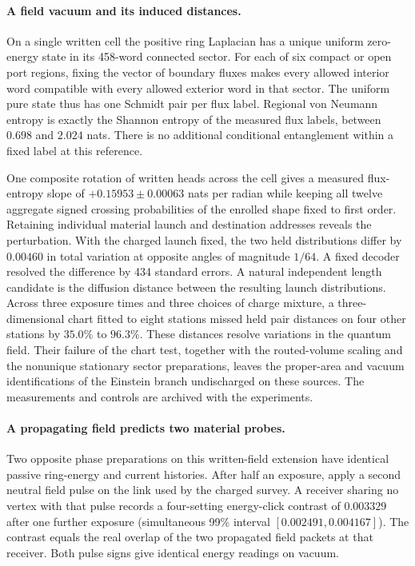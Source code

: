 \documentclass[11pt]{article}
\begin{document}
\paragraph{A field vacuum and its induced distances.}
On a single written cell the positive ring Laplacian has a unique
uniform zero-energy state in its 458-word connected sector. For each of
six compact or open port regions, fixing the vector of boundary fluxes
makes every allowed interior word compatible with every allowed exterior
word in that sector. The uniform pure state thus has one Schmidt pair
per flux label. Regional von Neumann entropy is exactly the Shannon
entropy of the measured flux labels, between $0.698$ and $2.024$ nats.
There is no additional conditional entanglement within a fixed label at
this reference.

One composite rotation of written heads across the cell gives a measured
flux-entropy slope of $+0.15953\pm0.00063$ nats per radian while keeping
all twelve aggregate signed crossing probabilities of the enrolled shape
fixed to first order. Retaining individual material launch and destination
addresses reveals the perturbation. With the charged launch fixed,
the two held distributions differ by $0.00460$ in total variation at
opposite angles of magnitude $1/64$. A fixed decoder resolved the
difference by 434 standard errors. A natural independent length candidate
is the diffusion distance between the resulting launch distributions.
Across three exposure times and three choices of charge mixture, a
three-dimensional chart fitted to eight stations missed held pair
distances on four other stations by $35.0\%$ to $96.3\%$. These distances
resolve variations in the quantum field. Their failure of the chart
test, together with the routed-volume scaling and the nonunique
stationary sector preparations, leaves the proper-area and vacuum
identifications of the Einstein branch undischarged on these sources.
The measurements and controls are archived with the
 experiments.

\paragraph{A propagating field predicts two material probes.}
Two opposite phase preparations on this written-field extension have
identical passive ring-energy and current histories. After half an
exposure, apply a second neutral field pulse on the link used by the
charged survey. A receiver sharing no vertex with that pulse records
a four-setting energy-click contrast of $0.003329$ after one further
exposure (simultaneous 99\% interval $[0.002491,0.004167]$).
The contrast equals the real overlap of the two propagated field packets
at that receiver. Both pulse signs give identical energy readings on vacuum.
\end{document}
